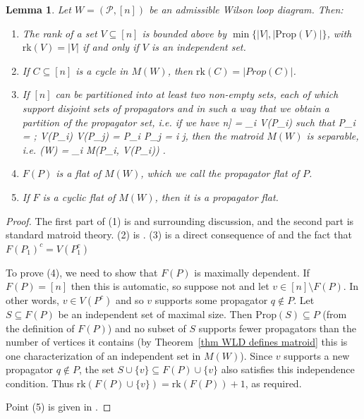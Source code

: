 \documentclass[11pt]{article}
\newcommand{\rk}{\textrm{rk} }
\def\bas #1\eas{\begin{align*} #1 \end{align*}}
\newcommand{\cP}{\mathcal{P}}
\newcommand{\Prop}{\textrm{Prop}}
\newtheorem{lem}[thm]{Lemma}
\theoremstyle{remark}
\theoremstyle{definition}
\begin{document}
\begin{lem}\label{lem facts about WLD matroids}
Let $W = (\cP,[n])$ be an admissible Wilson loop diagram. Then:
\begin{enumerate}
\item The rank of a set $V \subseteq [n]$ is bounded above by $\min\{|V|,|\Prop(V)|\}$, with $\rk(V) = |V|$ if and only if $V$ is an independent set.
\item If $C \subseteq [n]$ is a cycle in $M(W)$, then $\rk(C) = |Prop(C)|$.
\item If $[n]$ can be partitioned into at least two non-empty sets, each of which support disjoint sets of propagators and in such a way that we obtain a partition of the propagator set, i.e. if we have \bas [n] = \sqcup_i V(P_i) \quad \textrm{ such that } \quad \sqcup P_i = \cP;  V(P_i) \cap V(P_j) = \emptyset {} P_i \cap P_j = \emptyset \quad \forall i \neq j\;, \eas then the matroid $M(W)$ is separable, i.e. \bas M(W) = \bigoplus_i M(P_i, V(P_i)) \;.\eas 
\item $F(P)$ is a flat of $M( W)$, which we call the \emph{propagator flat} of $P$.
\item If $F$ is a cyclic flat of $M(W)$, then it is a propagator flat.
\end{enumerate}
\end{lem}
\begin{proof}
The first part of (1) is \cite[Equation (9)]{wilsonloop} and surrounding discussion, and the second part is standard matroid theory. (2) is \cite[Lemma 3.27]{wilsonloop}. (3) is a direct consequence of \cite[Lemma 3.20]{wilsonloop} and the fact that $F(P_1)^c = V(P_1^c)$

To prove (4), we need to show that $F(P)$ is maximally dependent. If $F(P) = [n]$ then this is automatic, so suppose not and let $v \in [n] \setminus F(P)$. In other words, $v \in V(P^c)$ and so $v$ supports some propagator $q \not\in P$.  Let $S \subseteq F(P)$ be an independent set of maximal size. Then $\Prop(S) \subseteq P$ (from the definition of $F(P)$) and no subset of $S$ supports fewer propagators than the number of vertices it contains (by Theorem~\ref{thm WLD defines matroid} this is one characterization of an independent set in $M(W)$). Since $v$ supports a new propagator $q \not\in P$, the set $S \cup \{v\} \subseteq F(P) \cup\{v\}$ also satisfies this independence condition. Thus $\rk(F(P) \cup\{v\}) = \rk(F(P)) + 1$, as required.

Point (5) is given in \cite[Lemma 3.28]{wilsonloop}.
\end{proof}
\end{document}
